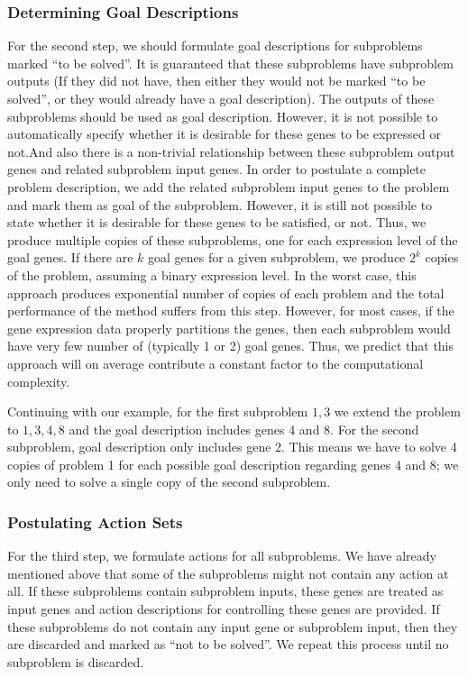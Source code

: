 \subsubsection{Determining Goal Descriptions}
For the second step, we should formulate goal descriptions for subproblems marked ``to be solved''. It is
guaranteed that these subproblems have subproblem outputs (If they did not have, then either they would not
be marked ``to be solved'', or they would already have a goal description). The outputs of these subproblems
should be used as goal description. However, it is not possible to automatically specify whether it is
desirable for these genes to be expressed or not.And also there is a non-trivial relationship between these subproblem output genes and related subproblem input genes. In order to postulate a complete problem description, we add the related subproblem input genes to the problem and mark them as goal of the subproblem. However,  it is still not possible to state whether it is desirable for these genes to be satisfied, or not. Thus, we produce multiple copies of these subproblems, one
for each expression level of the goal genes. If there are $k$ goal genes for a given
subproblem, we produce $2^k$ copies of the problem, assuming a binary expression level. In the worst case,
this approach produces exponential number of copies of each problem and the total performance of the method
suffers from this step. However, for most cases, if the gene expression data properly partitions the genes,
then each subproblem would have very few number of (typically 1 or 2) goal genes. Thus, we predict
that this approach will on average contribute a constant factor to the computational complexity.

Continuing with our example, for the first subproblem ${1,3}$ we extend the problem to ${1,3,4,8}$ and the goal description includes genes 4 and 8. For the second subproblem, goal description only includes gene 2. This means we have to solve 4 copies of problem 1 for each possible goal description regarding genes 4 and 8; we only need to solve a single copy of the second subproblem.

\subsubsection{Postulating Action Sets}
For the third step, we formulate actions for all subproblems. We have already mentioned above that some of
the subproblems might not contain any action at all. If these subproblems contain subproblem inputs, these
genes are treated as input genes and action descriptions for controlling these genes are provided. If these
subproblems do not contain any input gene or subproblem input, then they are discarded and marked as ``not to
be solved''. We repeat this process until no subproblem is discarded.


